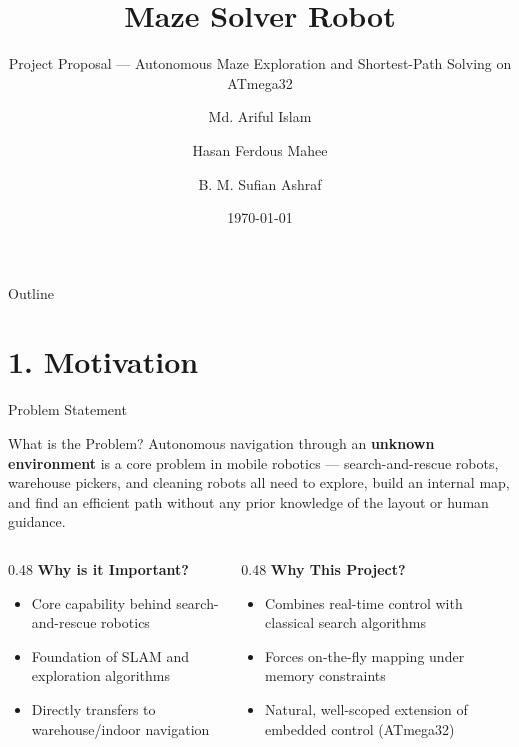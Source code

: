 \documentclass[aspectratio=169,11pt]{beamer}
\title[Maze Solver Robot]{Maze Solver Robot}
\subtitle{Project Proposal --- Autonomous Maze Exploration and Shortest-Path Solving on ATmega32}
\author{Md. Ariful Islam \and Hasan Ferdous Mahee \and B. M. Sufian Ashraf}
\institute{Department of Computer Science and Engineering}
\date{\today}
\newcommand{\highlight}[1]{\textcolor{teal!80!black}{\textbf{#1}}}
\begin{document}

\begin{frame}
    \titlepage
\end{frame}

\begin{frame}{Outline}
    \tableofcontents
\end{frame}

\section{1. Motivation}
\begin{frame}{Problem Statement}
    \small
    \begin{block}{What is the Problem?}
        \small Autonomous navigation through an \highlight{unknown environment} is a core problem in mobile robotics --- search-and-rescue robots, warehouse pickers, and cleaning robots all need to explore, build an internal map, and find an efficient path without any prior knowledge of the layout or human guidance.
    \end{block}

    \vspace{0.25cm}
    \begin{columns}[T]
        \begin{column}{0.48\textwidth}
            \textbf{Why is it Important?}
            \begin{itemize}\setlength{\itemsep}{0pt}
                \item Core capability behind search-and-rescue robotics
                \item Foundation of SLAM and exploration algorithms
                \item Directly transfers to warehouse/indoor navigation
            \end{itemize}
        \end{column}
        \begin{column}{0.48\textwidth}
            \textbf{Why This Project?}
            \begin{itemize}\setlength{\itemsep}{0pt}
                \item Combines real-time control with classical search algorithms
                \item Forces on-the-fly mapping under memory constraints
                \item Natural, well-scoped extension of embedded control (ATmega32)
            \end{itemize}
        \end{column}
    \end{columns}
\end{frame}
\end{document}
